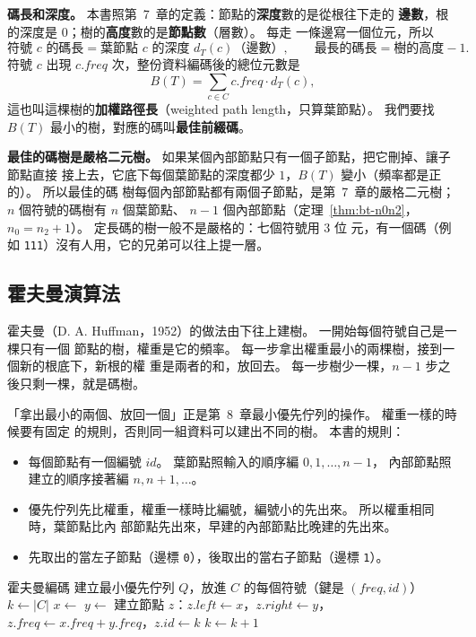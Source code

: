 \textbf{碼長和深度。} 本書照第~7~章的定義：節點的\textbf{深度}數的是從根往下走的
\textbf{邊數}，根的深度是 $0$；樹的\textbf{高度}數的是\textbf{節點數}（層數）。 每走
一條邊寫一個位元，所以
\[
\text{符號 $c$ 的碼長} = \text{葉節點 $c$ 的深度 } d_T(c) \text{（邊數）}, \qquad
\text{最長的碼長} = \text{樹的高度} - 1.
\]
符號 $c$ 出現 $c.\mathit{freq}$ 次，整份資料編碼後的總位元數是
\[
B(T) = \sum_{c \in C} c.\mathit{freq} \cdot d_T(c),
\]
這也叫這棵樹的\textbf{加權路徑長}（weighted path length，只算葉節點）。 我們要找
$B(T)$ 最小的樹，對應的碼叫\textbf{最佳前綴碼}。

\textbf{最佳的碼樹是嚴格二元樹。} 如果某個內部節點只有一個子節點，把它刪掉、讓子節點直接
接上去，它底下每個葉節點的深度都少 $1$，$B(T)$ 變小（頻率都是正的）。 所以最佳的碼
樹每個內部節點都有兩個子節點，是第~7~章的嚴格二元樹；$n$ 個符號的碼樹有 $n$ 個葉節點、
$n - 1$ 個內部節點（定理~\ref{thm:bt-n0n2}，$n_0 = n_2 + 1$）。 定長碼的樹一般不是嚴格的：七個符號用 $3$ 位
元，有一個碼（例如 \texttt{111}）沒有人用，它的兄弟可以往上提一層。

\subsection{霍夫曼演算法}

霍夫曼（D. A. Huffman，1952）的做法由下往上建樹。 一開始每個符號自己是一棵只有一個
節點的樹，權重是它的頻率。 每一步拿出權重最小的兩棵樹，接到一個新的根底下，新根的權
重是兩者的和，放回去。 每一步樹少一棵，$n - 1$ 步之後只剩一棵，就是碼樹。

「拿出最小的兩個、放回一個」正是第~8~章最小優先佇列的操作。 權重一樣的時候要有固定
的規則，否則同一組資料可以建出不同的樹。 本書的規則：

\begin{itemize}
\item 每個節點有一個編號 $\mathit{id}$。 葉節點照輸入的順序編 $0, 1, \ldots, n - 1$，
內部節點照建立的順序接著編 $n, n + 1, \ldots$。
\item 優先佇列先比權重，權重一樣時比編號，編號小的先出來。 所以權重相同時，葉節點比內
部節點先出來，早建的內部節點比晚建的先出來。
\item 先取出的當左子節點（邊標 \texttt{0}），後取出的當右子節點（邊標 \texttt{1}）。
\end{itemize}

\begin{pseudo}[label=alg:gr-huffman]{霍夫曼編碼}
 
    \State 建立最小優先佇列 $Q$，放進 $C$ 的每個符號（鍵是 $(\mathit{freq}, \mathit{id})$）
    \State $k \gets |C|$ 
        \State $x \gets$ 
        \State $y \gets$ 
        \State 建立節點 $z$：$z.\mathit{left} \gets x$，$z.\mathit{right} \gets y$，
        $z.\mathit{freq} \gets x.\mathit{freq} + y.\mathit{freq}$，$z.\mathit{id} \gets k$
        \State $k \gets k + 1$
        \State {}
    \EndWhile
    \State \Return {} 
\EndFunction
\end{pseudo}

